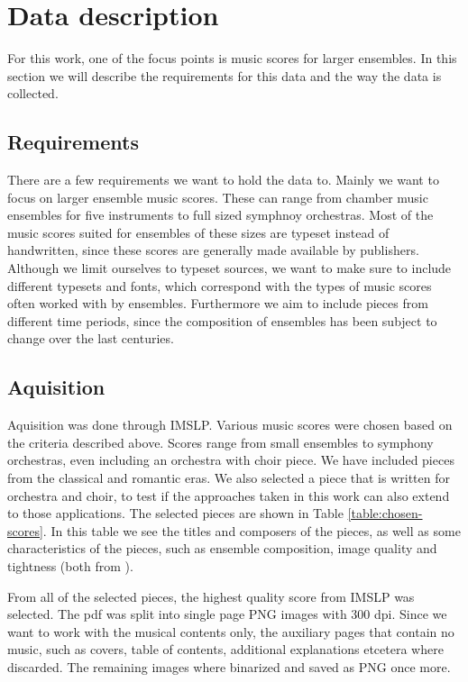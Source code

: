 \chapter{Data description}\label{chap:data-description}

For this work, one of the focus points is music scores for larger ensembles. In this section we will describe the requirements for this data and the way the data is collected.

\section{Requirements}\label{sec:data-description-requirements}
There are a few requirements we want to hold the data to. Mainly we want to focus on larger ensemble music scores. These can range from chamber music ensembles for five instruments to full sized symphnoy orchestras. Most of the music scores suited for ensembles of these sizes are typeset instead of handwritten, since these scores are generally made available by publishers. Although we limit ourselves to typeset sources, we want to make sure to include different typesets and fonts, which correspond with the types of music scores often worked with by ensembles. Furthermore we aim to include pieces from different time periods, since the composition of ensembles has been subject to change over the last centuries.

\section{Aquisition}\label{sec:data-description-aquisition}
Aquisition was done through IMSLP. Various music scores were chosen based on the criteria described above. Scores range from small ensembles to symphony orchestras, even including an orchestra with choir piece. We have included pieces from the classical and romantic eras. We also selected a piece that is written for orchestra and choir, to test if the approaches taken in this work can also extend to those applications. The selected pieces are shown in Table \ref{table:chosen-scores}. In this table we see the titles and composers of the pieces, as well as some characteristics of the pieces, such as ensemble composition, image quality and tightness (both from \citep{Byrd2015}).

From all of the selected pieces, the highest quality score from IMSLP was selected. The pdf was split into single page PNG images with 300 dpi. Since we want to work with the musical contents only, the auxiliary pages that contain no music, such as covers, table of contents, additional explanations etcetera where discarded. The remaining images where binarized and saved as PNG once more.

